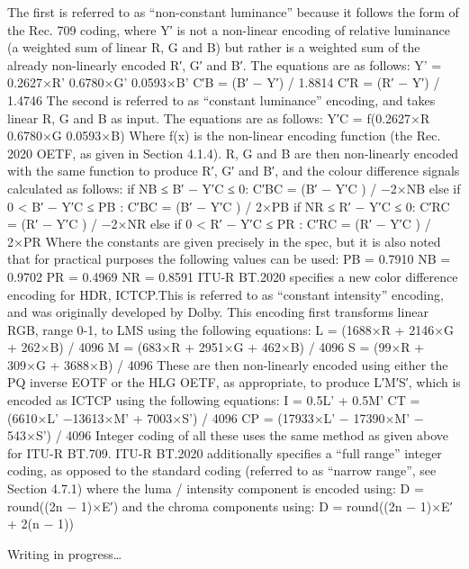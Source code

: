 The first is referred to as “non-constant luminance” because it follows the form of the Rec. 709 coding, where Y′ is not a non-linear encoding of relative luminance (a weighted sum of linear R, G and B) but rather is a weighted sum of the already non-linearly encoded R′, G′ and B′. The equations are as follows:
	Y' = 0.2627×R'  0.6780×G'  0.0593×B'
	C′B = (B′ − Y′) / 1.8814
	C′R = (R′ − Y′) / 1.4746
The second is referred to as “constant luminance” encoding, and takes linear R, G and B as input. The equations are as follows:
	Y′C = f(0.2627×R  0.6780×G  0.0593×B)
Where f(x) is the non-linear encoding function (the Rec. 2020 OETF, as given in Section 4.1.4). R, G and B are then non-linearly encoded with the same function to produce R′, G′ and B′, and the colour difference signals calculated as follows:
	if NB ≤ B′ − Y′C ≤ 0:
C′BC = (B′ − Y′C ) / −2×NB
else if 0 < B′ − Y′C ≤ PB :
	C′BC = (B′ − Y′C ) / 2×PB
	if NR ≤ R′ − Y′C ≤ 0:
C′RC = (R′ − Y′C ) / −2×NR
else if 0 < R′ − Y′C ≤ PR :
	C′RC = (R′ − Y′C ) / 2×PR
Where the constants are given precisely in the spec, but it is also noted that for practical purposes the following values can be used:
	PB = 0.7910
NB = 0.9702
PR = 0.4969
NR = 0.8591
ITU-R BT.2020 specifies a new color difference encoding for HDR,  ICTCP.This is referred to as “constant intensity” encoding, and was originally developed by Dolby. This encoding first transforms linear RGB, range 0-1, to LMS using the following equations:
	L = (1688×R + 2146×G + 262×B) / 4096
M = (683×R + 2951×G + 462×B) / 4096
S = (99×R + 309×G + 3688×B) / 4096
These are then non-linearly encoded using either the PQ inverse EOTF or the HLG OETF, as appropriate, to produce L′M′S′, which is encoded as  ICTCP using the following equations:
	I = 0.5L' + 0.5M'
	CT = (6610×L' −13613×M' + 7003×S') / 4096
CP = (17933×L' − 17390×M' − 543×S') / 4096
Integer coding of all these uses the same method as given above for ITU-R BT.709. ITU-R BT.2020 additionally specifies a “full range” integer coding, as opposed to the standard coding (referred to as “narrow range”, see Section 4.7.1) where the luma / intensity component is encoded using:
	D = round((2n − 1)×E′)
and the chroma components using:
	D = round((2n − 1)×E′ + 2(n − 1))


Writing in progress…

